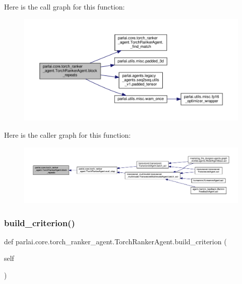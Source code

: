 Here is the call graph for this function\+:
\nopagebreak
\begin{figure}[H]
\begin{center}
\leavevmode
\includegraphics[width=350pt]{classparlai_1_1core_1_1torch__ranker__agent_1_1TorchRankerAgent_a628050d71339298baafbaf678f94207d_cgraph}
\end{center}
\end{figure}
Here is the caller graph for this function\+:
\nopagebreak
\begin{figure}[H]
\begin{center}
\leavevmode
\includegraphics[width=350pt]{classparlai_1_1core_1_1torch__ranker__agent_1_1TorchRankerAgent_a628050d71339298baafbaf678f94207d_icgraph}
\end{center}
\end{figure}
\mbox{\label{classparlai_1_1core_1_1torch__ranker__agent_1_1TorchRankerAgent_a16d004a75c5fee42cd13db4abe157b98}} 
\subsubsection{\texorpdfstring{build\+\_\+criterion()}{build\_criterion()}}
{\footnotesize\ttfamily def parlai.\+core.\+torch\+\_\+ranker\+\_\+agent.\+Torch\+Ranker\+Agent.\+build\+\_\+criterion (\begin{DoxyParamCaption}\item[{}]{self }\end{DoxyParamCaption})}

